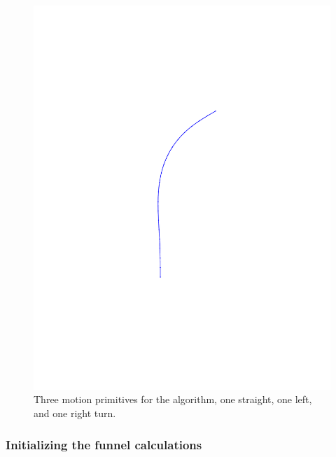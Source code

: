 \begin{figure}
\begin{minipage}[b]{0.3\textwidth}
    \includegraphics[trim={5cm 5cm 5cm 5cm},
    width=\textwidth]{figures/method/right-trajector}
  \end{minipage}
  \caption{Three motion primitives for the \rrtfunnel{} algorithm, one straight,
    one left, and one right turn.}
  \label{fig:initial-trajectories}
\end{figure}

\subsubsection{Initializing the funnel calculations}
\label{subsec:initializing-tvlqr}

